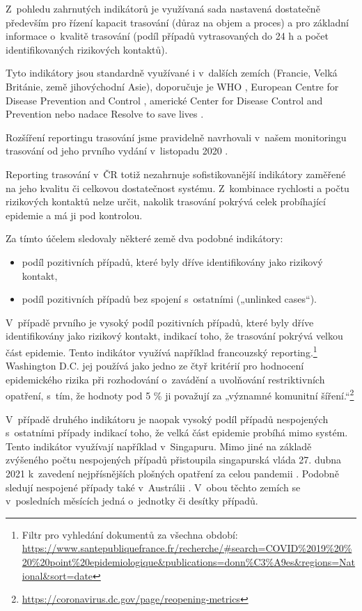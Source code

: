 Z~pohledu zahrnutých indikátorů je využívaná sada nastavená dostatečně pře\-de\-vším pro řízení kapacit trasování (důraz na objem a proces) a pro základní informace o~kvalitě trasování (podíl případů vytrasovaných do 24 h a počet identifikovaných rizikových kontaktů).

Tyto indikátory jsou standardně využívané i v~dalších zemích (Francie, Velká Británie, země jihovýchodní Asie), doporučuje je WHO \cite{tr_WHO_2021}, European Centre for Disease Prevention and Control \cite{tr_ECDC_2020}, americké Center for Disease Control and Prevention \cite{tr_CDC_2020} nebo nadace Resolve to save lives \cite{tr_contact_tracing}.

Rozšíření reportingu trasování jsme pravidelně navrhovali v~našem monitoringu trasování od jeho prvního vydání v~listopadu 2020 \cite{tr_bisop07}.

Reporting trasování v~ČR totiž nezahrnuje sofistikovanější indikátory zaměřené na jeho kvalitu či celkovou dostatečnost systému. Z~kombinace rychlosti a počtu rizikových kontaktů nelze určit, nakolik trasování pokrývá celek probíhající epidemie a má ji pod kontrolou.

Za tímto účelem sledovaly některé země dva podobné indikátory:
\begin{itemize}
\item podíl pozitivních případů, které byly dříve identifikovány jako rizikový kontakt,
\item podíl pozitivních případů bez spojení s~ostatními („unlinked cases“).
\end{itemize}

V~případě prvního je vysoký podíl pozitivních případů, které byly dříve identifikovány jako rizikový kontakt, indikací toho, že trasování pokrývá velkou část epidemie. Tento indikátor využívá například francouzský reporting.\footnote{Filtr pro vyhledání dokumentů za všechna období: \url{https://www.santepubliquefrance.fr/recherche/\#search=COVID\%2019\%20\%20\%20point\%20epidemiologique&publications=donn\%C3\%A9es&regions=National&sort=date}} Washington D.C. jej používá jako jedno ze čtyř kritérií pro hodnocení epidemického rizika při rozhodování o~zavádění a uvolňování restriktivních opatření, s~tím, že hodnoty pod 5 \% ji považují za „významné komunitní šíření.“\footnote{\url{https://coronavirus.dc.gov/page/reopening-metrics}}


V~případě druhého indikátoru je naopak vysoký podíl případů nespojených s~os\-tat\-ní\-mi případy indikací toho, že velká část epidemie probíhá mimo systém. Tento indikátor využívají například v~Singapuru. Mimo jiné na základě zvýšeného počtu nespojených případů přistoupila singapurská vláda 27. dubna 2021 k~zavedení nej\-pří\-sněj\-ších plošných opatření za celou pandemii \cite{tr_Singapour}. Podobně sledují nespojené případy také v~Austrálii \cite{tr_australie}. V~obou těchto zemích se v~posledních měsících jedná o~jednotky či desítky případů.

